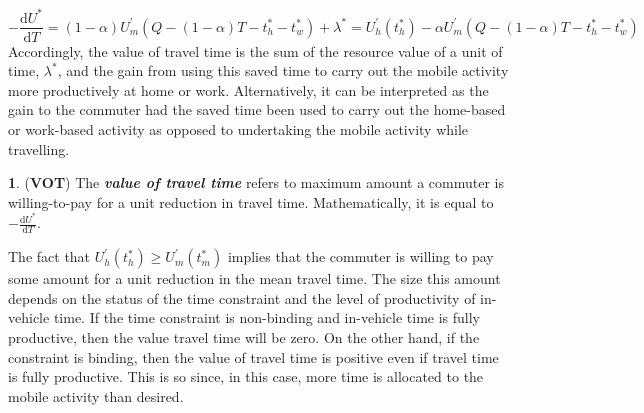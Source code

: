 \documentclass[12pt,a4paper,british]{article}
\theoremstyle{definition}
\newtheorem{defn}{\protect\definitionname}
\theoremstyle{plain}
\theoremstyle{plain}
\providecommand{\definitionname}{Definition}
\begin{document}
\begin{equation}
-\frac{\mathrm{d}U^{\ast}}{\mathrm{d}T}=\left(1-\alpha\right)U_{m}^{\prime}\left(Q-\left(1-\alpha\right)T-t_{h}^{\ast}-t_{w}^{\ast}\right)+\lambda^{\ast}=U_{h}^{\prime}\left(t_{h}^{*}\right)-\alpha U_{m}^{\prime}\left(Q-\left(1-\alpha\right)T-t_{h}^{\ast}-t_{w}^{\ast}\right)\label{eq:VOT_det}
\end{equation}
Accordingly, the value of travel time is the sum of the resource value
of a unit of time, $\lambda^{\ast}$, and the gain from using this
saved time to carry out the mobile activity more productively at home
or work. Alternatively, it can be interpreted as the gain to the commuter
had the saved time been used to carry out the home-based or work-based
activity as opposed to undertaking the mobile activity while travelling.
\begin{defn}
(\textbf{VOT}) The \textbf{\textit{value of travel time}} refers to
maximum amount a commuter is willing-to-pay for a unit reduction in
travel time. Mathematically, it is equal to $-\frac{\mathrm{d}U^{\ast}}{\mathrm{d}T}$.
\end{defn}
The fact that $U_{h}^{\prime}\left(t_{h}^{*}\right)\geq U_{m}^{\prime}\left(t_{m}^{\ast}\right)$
implies that the commuter is willing to pay some amount for a unit
reduction in the mean travel time. The size this amount depends on
the status of the time constraint and the level of productivity of
in-vehicle time. If the time constraint is non-binding and in-vehicle
time is fully productive, then the value travel time will be zero.
On the other hand, if the constraint is binding, then the value of
travel time is positive even if travel time is fully productive. This
is so since, in this case, more time is allocated to the mobile activity
than desired. 
\end{document}
